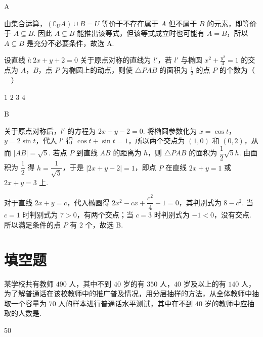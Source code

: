 \begin{answer}
A
\end{answer}

\begin{solution}
由集合运算，\((\complement_U A)\cup B=U\) 等价于不存在属于 \(A\) 但不属于 \(B\) 的元素，即等价于 \(A\subseteq B\). 因此 \(A\subsetneq B\) 能推出该等式，但该等式成立时也可能有 \(A=B\)，所以 \(A\subsetneq B\) 是充分不必要条件，故选 A.
\end{solution}

\begin{problem}
设直线 \(l: 2x + y + 2 = 0\) 关于原点对称的直线为 \(l'\)，若 \(l'\) 与椭圆 \(x^2 + \frac{y^2}{4} = 1\) 的交点为 \(A\)，\(B\)，点 \(P\) 为椭圆上的动点，则使 \(\triangle PAB\) 的面积为 \(\frac{1}{2}\) 的点 \(P\) 的个数为（\(\quad\)）

\choices
    {\(1\)}
    {\(2\)}
    {\(3\)}
    {\(4\)}
\end{problem}

\begin{answer}
B
\end{answer}

\begin{solution}
关于原点对称后，\(l'\) 的方程为 \(2x+y-2=0\). 将椭圆参数化为 \(x=\cos t\)，\(y=2\sin t\)，代入 \(l'\) 得 \(\cos t+\sin t=1\)，所以两个交点为 \((1,0)\) 和 \((0,2)\)，从而 \(|AB|=\sqrt5\). 若点 \(P\) 到直线 \(AB\) 的距离为 \(h\)，则 \(\triangle PAB\) 的面积为 \(\dfrac12\sqrt5h\). 由面积为 \(\dfrac12\) 得 \(h=\dfrac1{\sqrt5}\)，于是
\(\left|2x+y-2\right|=1\)，即点 \(P\) 在直线 \(2x+y=1\) 或 \(2x+y=3\) 上.

对于直线 \(2x+y=c\)，代入椭圆得
\(2x^2-cx+\dfrac{c^2}{4}-1=0\)，其判别式为 \(8-c^2\). 当 \(c=1\) 时判别式为 \(7>0\)，有两个交点；当 \(c=3\) 时判别式为 \(-1<0\)，没有交点. 所以满足条件的点 \(P\) 有 \(2\) 个，故选 B.
\end{solution}

\section{填空题}
\begin{problem}
某学校共有教师 \(490\) 人，其中不到 \(40\) 岁的有 \(350\) 人，\(40\) 岁及以上的有 \(140\) 人，为了解普通话在该校教师中的推广普及情况，用分层抽样的方法，从全体教师中抽取一个容量为 \(70\) 人的样本进行普通话水平测试，其中在不到 \(40\) 岁的教师中应抽取的人数是\fillinblank{}.
\end{problem}

\begin{answer}
50
\end{answer}

